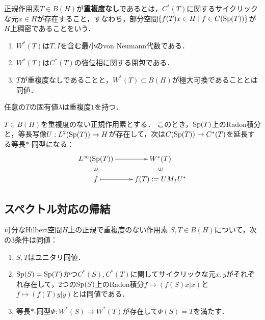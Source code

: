 \documentclass[uplatex,dvipdfmx]{jsreport}
\begin{document}
\begin{definition}
    正規作用素$T\in B(H)$が\textbf{重複度なし}であるとは，$C^*(T)$に関するサイクリックな元$x\in H$が存在すること，すなわち，部分空間$\left\{f(T)x\in H\mid f\in C(\mathrm{Sp}(T))\right\}$が$H$上稠密であることをいう．
\end{definition}
\begin{lemma}\mbox{}\label{lemma-W*(T)}
    \begin{enumerate}
        \item $W^*(T)$は$T,I$を含む最小のvon Neumann代数である．
        \item $W^*(T)$は$C^*(T)$の強位相に関する閉包である．
        \item $T$が重複度なしであることと，$W^*(T)\subset B(H)$が極大可換であることとは同値．
    \end{enumerate}
\end{lemma}
\begin{remark}
    任意の$T$の固有値$\lambda$は重複度$1$を持つ．
\end{remark}

\begin{corollary}
    $T\in B(H)$を重複度のない正規作用素とする．
    このとき，$\mathrm{Sp}(T)$上のRadon積分と，等長写像$U:L^2(\mathrm{Sp}(T))\to H$が存在して，次は$C(\mathrm{Sp}(T))\to C^*(T)$を延長する等長$*$-同型になる：
    \[\xymatrix@R-2pc{
        L^\infty(\Sp(T))\ar[r]&W^*(T)\\
        \rotatebox[origin=c]{90}{$\in$}&\rotatebox[origin=c]{90}{$\in$}\\
        f\ar@{|->}[r]&f(T):=UM_fU^*
    }\]
\end{corollary}

\subsection{スペクトル対応の帰結}

\begin{proposition}
    可分なHilbert空間$H$上の正規で重複度のない作用素
    $S,T\in B(H)$について，次の3条件は同値：
    \begin{enumerate}
        \item $S,T$はユニタリ同値．
        \item $\mathrm{Sp}(S)=\mathrm{Sp}(T)$かつ$C^*(S),C^*(T)$に関してサイクリックな元$x,y$がそれぞれ存在して，2つの$\mathrm{Sp}(S)$上のRadon積分$f\mapsto(f(S)x|x)$と$f\mapsto(f(T)y|y)$とは同値である．
        \item 等長$*$-同型$\Phi:W^*(S)\to W^*(T)$が存在して$\Phi(S)=T$を満たす．
    \end{enumerate}
\end{proposition}
\end{document}
